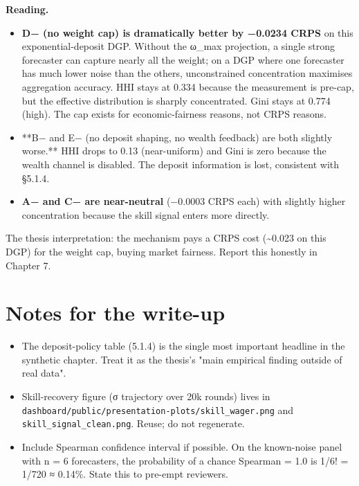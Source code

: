 \documentclass[11pt,a4paper,openany]{report}
\begin{document}
\textbf{Reading.}

\begin{itemize}
  \item \textbf{D− (no weight cap) is dramatically better by −0.0234 CRPS} on
    this exponential-deposit DGP. Without the ω\_max projection, a
    single strong forecaster can capture nearly all the weight; on a
    DGP where one forecaster has much lower noise than the others,
    unconstrained concentration maximises aggregation accuracy. HHI
    stays at 0.334 because the measurement is pre-cap, but the effective
    distribution is sharply concentrated. Gini stays at 0.774 (high).
    The cap exists for economic-fairness reasons, not CRPS reasons.
  \item **B− and E− (no deposit shaping, no wealth feedback) are both
    slightly worse.** HHI drops to 0.13 (near-uniform) and Gini is
    zero because the wealth channel is disabled. The deposit
    information is lost, consistent with §5.1.4.
  \item \textbf{A− and C− are near-neutral} (−0.0003 CRPS each) with slightly
    higher concentration because the skill signal enters more directly.
\end{itemize}

The thesis interpretation: the mechanism pays a CRPS cost (\textasciitilde{}0.023 on
this DGP) for the weight cap, buying market fairness. Report this
honestly in Chapter 7.

\section{Notes for the write-up}

\begin{itemize}
  \item The deposit-policy table (5.1.4) is the single most important
    headline in the synthetic chapter. Treat it as the thesis's "main
    empirical finding outside of real data".
  \item Skill-recovery figure (σ trajectory over 20k rounds) lives in
    \texttt{dashboard/public/presentation-plots/skill\_wager.png} and
    \texttt{skill\_signal\_clean.png}. Reuse; do not regenerate.
  \item Include Spearman confidence interval if possible. On the known-noise
    panel with n = 6 forecasters, the probability of a chance Spearman
    = 1.0 is 1/6! = 1/720 ≈ 0.14\%. State this to pre-empt reviewers.
\end{itemize}
\end{document}
